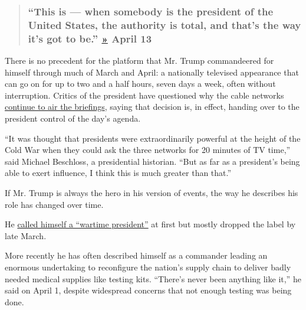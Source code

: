 \begin{quote}
\hypertarget{this-is--when-somebody-is-the-president-of-the-united-states-the-authority-is-total-and-thats-the-way-its-got-to-be--april-13}{%
\subsubsection{\texorpdfstring{``This is --- when somebody is the
president of the United States, the authority is total, and that's the
way it's got to be.''
\href{https://www.whitehouse.gov/briefings-statements/remarks-president-trump-vice-president-pence-members-coronavirus-task-force-press-briefing-25/}{»}
\textbf{April
13}}{``This is --- when somebody is the president of the United States, the authority is total, and that's the way it's got to be.'' » April 13}}\label{this-is--when-somebody-is-the-president-of-the-united-states-the-authority-is-total-and-thats-the-way-its-got-to-be--april-13}}
\end{quote}

There is no precedent for the platform that Mr. Trump commandeered for
himself through much of March and April: a nationally televised
appearance that can go on for up to two and a half hours, seven days a
week, often without interruption. Critics of the president have
questioned why the cable networks
\href{https://www.nytimes.com/2020/03/25/business/media/trump-coronavirus-briefings-ratings.html}{continue
to air the briefings}, saying that decision is, in effect, handing over
to the president control of the day's agenda.

``It was thought that presidents were extraordinarily powerful at the
height of the Cold War when they could ask the three networks for 20
minutes of TV time,'' said Michael Beschloss, a presidential historian.
``But as far as a president's being able to exert influence, I think
this is much greater than that.''

If Mr. Trump is always the hero in his version of events, the way he
describes his role has changed over time.

He
\href{https://www.nytimes.com/2020/03/22/us/politics/coronavirus-trump-wartime-president.html}{called
himself a ``wartime president''} at first but mostly dropped the label
by late March.

More recently he has often described himself as a commander leading an
enormous undertaking to reconfigure the nation's supply chain to deliver
badly needed medical supplies like testing kits. ``There's never been
anything like it,'' he said on April 1, despite widespread concerns that
not enough testing was being done.

